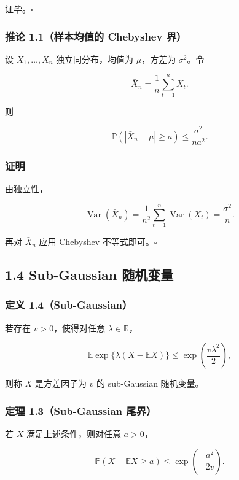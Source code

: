 \documentclass[
  11pt,
  a4paper,
]{ctexart}
\begin{document}
证毕。\(\square\)

\subsubsection{推论 1.1（样本均值的 Chebyshev
界）}\label{ux63a8ux8bba-1.1ux6837ux672cux5747ux503cux7684-chebyshev-ux754c}

设 \(X_1,\ldots,X_n\) 独立同分布，均值为 \(\mu\)，方差为
\(\sigma^2\)。令

\[
\bar X_n=\frac1n\sum_{t=1}^nX_t.
\]

则

\[
\mathbb P(|\bar X_n-\mu|\ge a)
\le\frac{\sigma^2}{na^2}.
\]

\subsubsection{证明}\label{ux8bc1ux660e-2}

由独立性，

\[
\operatorname{Var}(\bar X_n)
=\frac1{n^2}\sum_{t=1}^n\operatorname{Var}(X_t)
=\frac{\sigma^2}{n}.
\]

再对 \(\bar X_n\) 应用 Chebyshev 不等式即可。\(\square\)

\subsection{1.4 Sub-Gaussian
随机变量}\label{sub-gaussian-ux968fux673aux53d8ux91cf}

\subsubsection{定义
1.4（Sub-Gaussian）}\label{ux5b9aux4e49-1.4sub-gaussian}

若存在 \(v>0\)，使得对任意 \(\lambda\in\mathbb R\)，

\[
\mathbb E\exp\{\lambda(X-\mathbb E X)\}
\le \exp\left(\frac{v\lambda^2}{2}\right),
\]

则称 \(X\) 是方差因子为 \(v\) 的 sub-Gaussian 随机变量。

\subsubsection{定理 1.3（Sub-Gaussian
尾界）}\label{ux5b9aux7406-1.3sub-gaussian-ux5c3eux754c}

若 \(X\) 满足上述条件，则对任意 \(a>0\)，

\[
\mathbb P(X-\mathbb EX\ge a)
\le\exp\left(-\frac{a^2}{2v}\right).
\]
\end{document}
